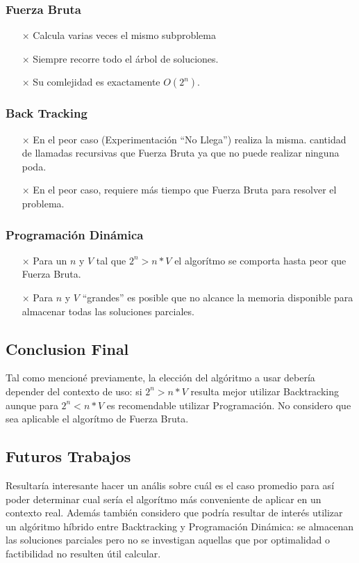 \subsubsection{Fuerza Bruta}
\begin{itemize}
    \item[$\times$] Calcula varias veces el mismo subproblema
	\item[$\times$] Siempre recorre todo el \'arbol de soluciones.
	\item[$\times$] Su comlejidad es exactamente $O(2^n)$.
\end{itemize}

\subsubsection{Back Tracking}
\begin{itemize}
    \item[$\times$] En el peor caso (Experimentaci\'on ``No Llega'') realiza la misma.
    cantidad de llamadas recursivas que Fuerza Bruta ya que no puede realizar ninguna poda.
    \item[$\times$] En el peor caso, requiere m\'as tiempo que Fuerza Bruta para
    resolver el problema.
\end{itemize}

\subsubsection{Programaci\'on Din\'amica}
\begin{itemize}
    \item[$\times$] Para un $n$ y $V$ tal que $2^n > n*V$ el algor\'itmo se comporta hasta
    peor que Fuerza Bruta.
    \item[$\times$] Para $n$ y $V$ ``grandes'' es posible que no alcance la memoria disponible
    para almacenar todas las soluciones parciales.
\end{itemize}

\subsection{Conclusion Final}
\par Tal como mencion\'e previamente, la elecci\'on del alg\'oritmo a usar deber\'ia depender
del contexto de uso: si $2^n > n*V$ resulta mejor utilizar Backtracking aunque para $2^n < n*V$
es recomendable utilizar Programaci\'on. No considero que sea aplicable el algor\'itmo de Fuerza
Bruta.

\subsection{Futuros Trabajos}
\par Resultar\'ia interesante hacer un an\'alis sobre cu\'al es el caso promedio para as\'i poder 
determinar cual ser\'ia el algor\'itmo m\'as conveniente de aplicar en un contexto real.
 Adem\'as tambi\'en considero que podr\'ia resultar de inter\'es utilizar un alg\'oritmo 
h\'ibrido entre Backtracking y Programaci\'on Din\'amica: se almacenan las soluciones parciales
pero no se investigan aquellas que por optimalidad o factibilidad no resulten \'util calcular.
